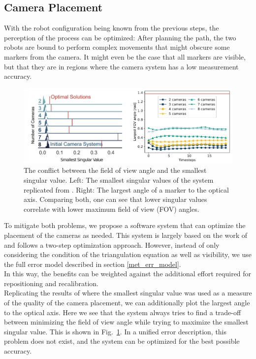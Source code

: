 \documentclass[5p,times,procedia]{elsarticle}
\begin{document}
\subsection{Camera Placement}
With the robot configuration being known from the previous steps, the perception of the process can be optimized:
After planning the path, the two robots are bound to perform complex movements that might obscure some markers from the camera.
It might even be the case that all markers are visible, but that they are in regions where the camera system has a low measurement accuracy.
\begin{figure}[H]
	\centering
	\includegraphics[width=0.95\columnwidth]{graphics/fov_sv_conflict.png}
	\caption{The conflict between the field of view angle and the smallest singular value. Left: The smallest singular values of the system replicated from \cite{camera_placement}. Right: The largest angle of a marker to the optical axis.
		Comparing both, one can see that lower singular values correlate with lower maximum field of view (FOV) angles.}
	\label{fig:fov_sv_conflict}
\end{figure}
To mitigate both problems, we propose a software system that can optimize the placement of the cameras as needed.
This system is largely based on the work of \cite{camera_placement} and follows a two-step optimization approach.
However, instead of only considering the condition of the triangulation equation as well as visibility, we use the full error model described in section \ref{met_err_model}.\\
In this way, the benefits can be weighted against the additional effort required  for repositioning and recalibration.\\
Replicating the results of \cite{camera_placement} where the smallest singular value was used as a measure of the quality of the camera placement, we can additionally plot the largest angle to the optical axis.
Here we see that the system always tries to find a trade-off between minimizing the field of view angle while trying to maximize the smallest singular value.
This is shown in Fig.~\ref{fig:fov_sv_conflict}.
In a unified error description, this problem does not exist, and the system can be optimized for the best possible accuracy.
%
\end{document}
